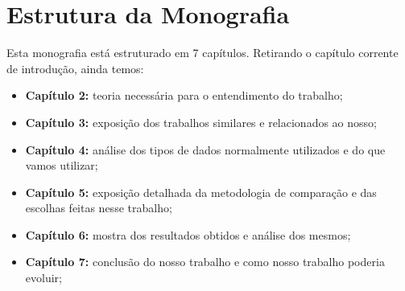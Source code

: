 \section{Estrutura da Monografia}

Esta monografia está estruturado em 7 capítulos. Retirando o capítulo corrente de introdução, ainda temos:

\begin{itemize}
    \item \textbf{Capítulo 2:} teoria necessária para o entendimento do trabalho;
    \item \textbf{Capítulo 3:} exposição dos trabalhos similares e relacionados ao nosso;
    \item \textbf{Capítulo 4:} análise dos tipos de dados normalmente utilizados e do que vamos utilizar;
    \item \textbf{Capítulo 5:} exposição detalhada da metodologia de comparação e das escolhas feitas nesse trabalho;
    \item \textbf{Capítulo 6:} mostra dos resultados obtidos e análise dos mesmos;
    \item \textbf{Capítulo 7:} conclusão do nosso trabalho e como nosso trabalho poderia evoluir;
\end{itemize}
